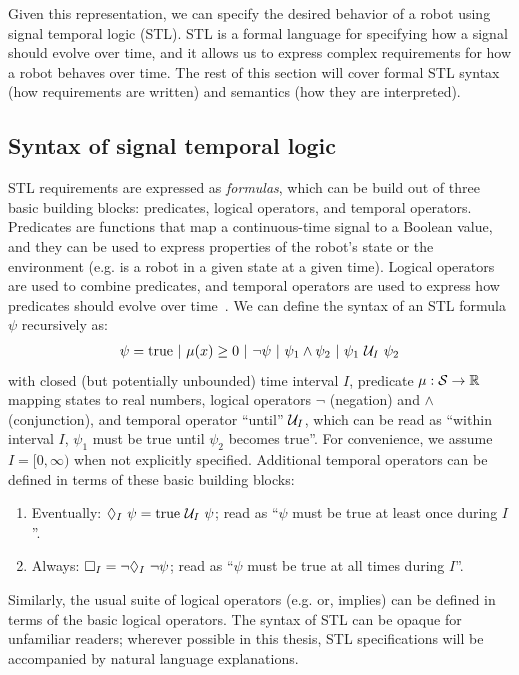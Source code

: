 Given this representation, we can specify the desired behavior of a robot using signal temporal logic (STL). STL is a formal language for specifying how a signal should evolve over time, and it allows us to express complex requirements for how a robot behaves over time. The rest of this section will cover formal STL syntax (how requirements are written) and semantics (how they are interpreted).

\subsection{Syntax of signal temporal logic}

STL requirements are expressed as \textit{formulas}, which can be build out of three basic building blocks: predicates, logical operators, and temporal operators. Predicates are functions that map a continuous-time signal to a Boolean value, and they can be used to express properties of the robot's state or the environment (e.g. is a robot in a given state at a given time). Logical operators are used to combine predicates, and temporal operators are used to express how predicates should evolve over time~\cite{donzeEfficientRobustMonitoring2013a}. We can define the syntax of an STL formula $\psi$ recursively as:
\begin{align}
	\psi = \text{true}\ |\ \mu(x) \geq 0\ |\ \neg \psi\ |\ \psi_1 \wedge \psi_2\ |\ \psi_1 \ \mathcal{U}_I\ \psi_2\label{ch:iros:stl_syntax}
\end{align}
with closed (but potentially unbounded) time interval $I$, predicate $\mu: \mathcal{S} \rightarrow \mathbb{R}$ mapping states to real numbers, logical operators $\neg$ (negation) and $\wedge$ (conjunction), and temporal operator ``until'' $\mathcal{U}_I$, which can be read as ``within interval $I$, $\psi_1$ must be true until $\psi_2$ becomes true''. For convenience, we assume $I = [0, \infty)$ when not explicitly specified. Additional temporal operators can be defined in terms of these basic building blocks:
\begin{enumerate}
	\item Eventually: $\lozenge_I\ \psi = \text{true } \mathcal{U}_I\ \psi$; read as ``$\psi$ must be true at least once during $I$''.
	\item Always: $\square_I = \neg \lozenge_I\ \neg \psi$; read as ``$\psi$ must be true at all times during $I$''.
\end{enumerate}
Similarly, the usual suite of logical operators (e.g. or, implies) can be defined in terms of the basic logical operators. The syntax of STL can be opaque for unfamiliar readers; wherever possible in this thesis, STL specifications will be accompanied by natural language explanations.

